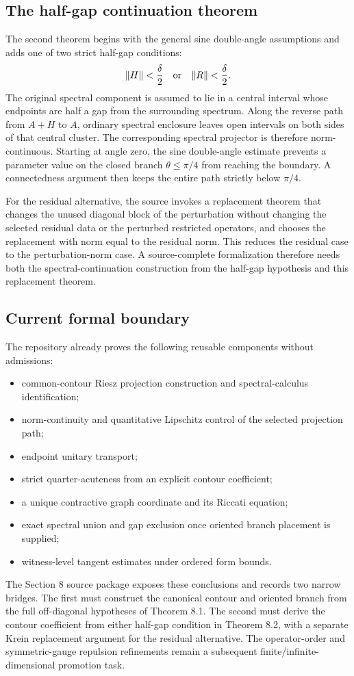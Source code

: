 \subsection{The half-gap continuation theorem}

The second theorem begins with the general sine double-angle assumptions and
adds one of two strict half-gap conditions:
\[
 \|H\|<\frac\delta2
 \quad\hbox{or}\quad
 \|R\|<\frac\delta2.
\]
The original spectral component is assumed to lie in a central interval whose
endpoints are half a gap from the surrounding spectrum.  Along the reverse
path from $A+H$ to $A$, ordinary spectral enclosure leaves open intervals on
both sides of that central cluster.  The corresponding spectral projector is
therefore norm-continuous.  Starting at angle zero, the sine double-angle
estimate prevents a parameter value on the closed branch
$\theta\le\pi/4$ from reaching the boundary.  A connectedness argument then
keeps the entire path strictly below $\pi/4$.

For the residual alternative, the source invokes a replacement theorem that
changes the unused diagonal block of the perturbation without changing the
selected residual data or the perturbed restricted operators, and chooses the
replacement with norm equal to the residual norm.  This reduces the residual
case to the perturbation-norm case.  A source-complete formalization therefore
needs both the spectral-continuation construction from the half-gap hypothesis
and this replacement theorem.

\subsection{Current formal boundary}

The repository already proves the following reusable components without
admissions:

\begin{itemize}
\item common-contour Riesz projection construction and spectral-calculus
identification;
\item norm-continuity and quantitative Lipschitz control of the selected
projection path;
\item endpoint unitary transport;
\item strict quarter-acuteness from an explicit contour coefficient;
\item a unique contractive graph coordinate and its Riccati equation;
\item exact spectral union and gap exclusion once oriented branch placement is
supplied;
\item witness-level tangent estimates under ordered form bounds.
\end{itemize}

The Section 8 source package exposes these conclusions and records two narrow
bridges.  The first must construct the canonical contour and oriented branch
from the full off-diagonal hypotheses of Theorem 8.1.  The second must derive
the contour coefficient from either half-gap condition in Theorem 8.2, with a
separate Krein replacement argument for the residual alternative.  The
operator-order and symmetric-gauge repulsion refinements remain a subsequent
finite/infinite-dimensional promotion task.
